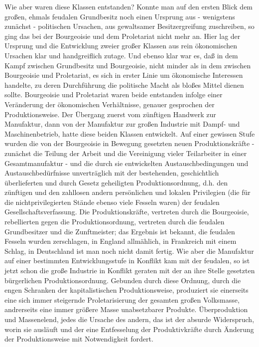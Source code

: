 Wie aber waren diese Klassen entstanden? Konnte man auf den
ersten Blick dem großen, ehmals feudalen Grundbesitz noch einen Ursprung
aus - wenigstens zunächst - politischen Ursachen, aus gewaltsamer
Besitzergreifung zuschreiben, so ging das bei der Bourgeoisie und dem
Proletariat nicht mehr an. Hier lag der Ursprung und die Entwicklung
zweier großer Klassen aus rein ökonomischen Ursachen klar und
handgreiflich zutage. Und ebenso klar war es, daß in dem Kampf zwischen
Grundbesitz und Bourgeoisie, nicht minder als in dem zwischen
Bourgeoisie und Proletariat, es sich in erster Linie um ökonomische
Interessen handelte, zu deren Durchführung die politische Macht als
bloßes Mittel dienen sollte. Bourgeoisie und Proletariat waren beide
entstanden infolge einer Veränderung der ökonomischen Verhältnisse,
genauer gesprochen der Produktionsweise. Der Übergang zuerst vom
zünftigen Handwerk zur Manufaktur, dann von der Manufaktur zur großen
Industrie mit Dampf- und Maschinenbetrieb, hatte diese beiden Klassen
entwickelt. Auf einer gewissen Stufe wurden die von der Bourgeoisie in
Bewegung gesetzten neuen Produktionskräfte - zunächst die Teilung der
Arbeit und die Vereinigung vieler Teilarbeiter in einer Gesamtmanufaktur
- und die durch sie entwickelten Austauschbedingungen und
Austauschbedürfnisse unverträglich mit der bestehenden, geschichtlich
überlieferten und durch Gesetz geheiligten Produktionsordnung, d.h. den
zünftigen und den zahllosen andern persönlichen und lokalen
Privilegien (die für die
nichtprivilegierten Stände ebenso viele Fesseln waren) der feudalen
Gesellschaftsverfassung. Die Produktionskräfte, vertreten durch die
Bourgeoisie, rebellierten gegen die Produktionsordnung, vertreten durch
die feudalen Grundbesitzer und die Zunftmeister; das Ergebnis ist
bekannt, die feudalen Fesseln wurden zerschlagen, in England allmählich,
in Frankreich mit einem Schlag, in Deutschland ist man noch nicht damit
fertig. Wie aber die Manufaktur auf einer bestimmten Entwicklungsstufe
in Konflikt kam mit der feudalen, so ist jetzt schon die große Industrie
in Konflikt geraten mit der an ihre Stelle gesetzten bürgerlichen
Produktionsordnung. Gebunden durch diese Ordnung, durch die engen
Schranken der kapitalistischen Produktionsweise, produziert sie
einerseits eine sich immer steigernde Proletarisierung der gesamten
großen Volksmasse, andrerseits eine immer größere Masse unabsetzbarer
Produkte. Überproduktion und Massenelend, jedes die Ursache des andern,
das ist der absurde Widerspruch, worin sie ausläuft und der eine
Entfesselung der Produktivkräfte durch Änderung der Produktionsweise mit
Notwendigkeit fordert.

